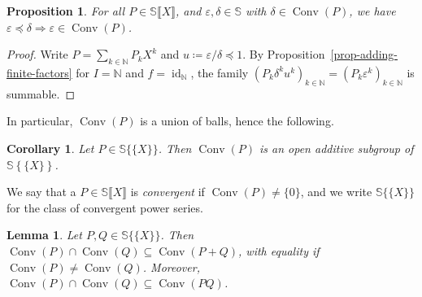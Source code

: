 \documentclass{article}
\newcommand{\assign}{\coloneqq}
\newcommand{\tmem}[1]{{\em #1\/}}
\newcommand{\tmop}[1]{\ensuremath{\operatorname{#1}}}
\newtheorem{corollary}[theorem]{Corollary}
\newtheorem{proposition}[theorem]{Proposition}
\newtheorem{lemma}[theorem]{Lemma}
\theoremstyle{remark}\newtheorem*{convention*}{Convention}
\begin{document}
\begin{proposition}
  \label{prop-analytic-convex}{\tmem{{\cite[Corollary~1.5.8]{Schm01}}}} For
  all $P \in \mathbb{S} \llbracket X \rrbracket$, and $\varepsilon, \delta \in
  \mathbb{S}$ with $\delta \in \tmop{Conv} (P)$, we have $\varepsilon
  \preccurlyeq \delta \Longrightarrow \varepsilon \in \tmop{Conv} (P)$.
\end{proposition}

\begin{proof}
  Write $P = \sum_{k \in \mathbb{N}} P_k X^k$ and $u \assign \varepsilon /
  \delta \preccurlyeq 1$. By Proposition~\ref{prop-adding-finite-factors} for
  $I =\mathbb{N}$ and $f = \tmop{id}_{\mathbb{N}}$, the family $(P_k \delta^k
  u^k)_{k \in \mathbb{N}} = (P_k \varepsilon^k)_{k \in \mathbb{N}}$ is
  summable.
\end{proof}

In particular, $\tmop{Conv} (P)$ is a union of balls, hence the following.

\begin{corollary}
  \label{cor-open-conv}Let $P \in \mathbb{S} \{ \!\! \{X\} \!\! \}$. Then
  $\tmop{Conv} (P)$ is an open additive subgroup of $\mathbb{S} \left\{ \!\! 
  \!\!\! \{ X \} \!\! \right\}$.
\end{corollary}

We say that a $P \in \mathbb{S} \llbracket X \rrbracket$ is
{\tmem{convergent}} if $\tmop{Conv} (P) \neq \{0\}$, and we write $\mathbb{S}
\{ \!\! \{X\} \!\! \}$\label{autolab18} for the class of convergent power
series.

\begin{lemma}
  \label{lem-conv-sum-prod}Let $P, Q \in \mathbb{S} \{ \!\! \{X\} \!\! \}$.
  Then $\tmop{Conv} (P) \cap \tmop{Conv} (Q) \subseteq \tmop{Conv} (P + Q)$,
  with equality if $\tmop{Conv} (P) \neq \tmop{Conv} (Q)$. Moreover,
  $\tmop{Conv} (P) \cap \tmop{Conv} (Q) \subseteq \tmop{Conv} (PQ)$.
\end{lemma}
\end{document}
